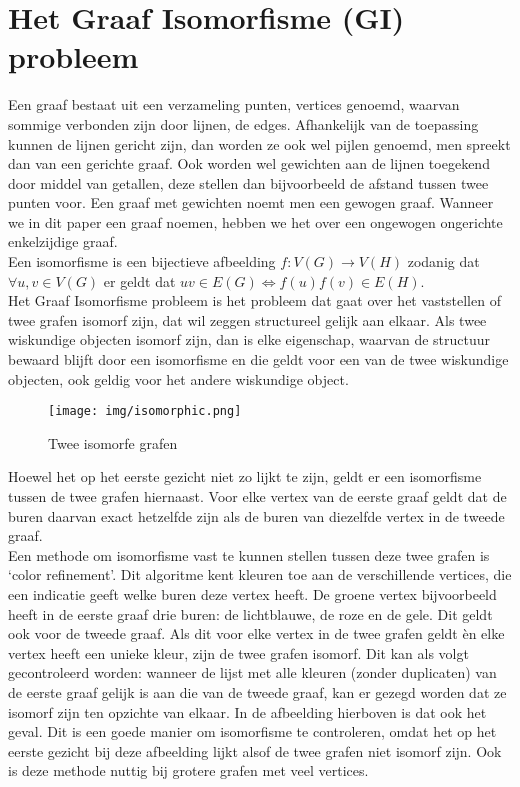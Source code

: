 \documentclass{article}
\begin{document}
\section{Het Graaf Isomorfisme (GI) probleem}
Een graaf bestaat uit een verzameling punten, vertices genoemd, waarvan sommige verbonden zijn door lijnen, de edges. Afhankelijk van de toepassing kunnen de lijnen gericht zijn, dan worden ze ook wel pijlen genoemd, men spreekt dan van een gerichte graaf. Ook worden wel gewichten aan de lijnen toegekend door middel van getallen, deze stellen dan bijvoorbeeld de afstand tussen twee punten voor. Een graaf met gewichten noemt men een gewogen graaf. Wanneer we in dit paper een graaf noemen, hebben we het over een ongewogen ongerichte enkelzijdige graaf.\\

Een isomorfisme is een bijectieve afbeelding $f:V(G) \rightarrow V(H)$ zodanig dat $\forall u,v \in V(G)$ er geldt dat $uv \in E(G) \Leftrightarrow f(u)f(v)\in E(H)$.\\

Het Graaf Isomorfisme probleem is het probleem dat gaat over het vaststellen of twee grafen isomorf zijn, dat wil zeggen structureel gelijk aan elkaar. Als twee wiskundige objecten isomorf zijn, dan is elke eigenschap, waarvan de structuur bewaard blijft door een isomorfisme en die geldt voor een van de twee wiskundige objecten, ook geldig voor het andere wiskundige object.\\

\begin{wrapfigure}{r}{0.5\textwidth}
\renewcommand{\figurename}{Figuur}
\begin{center}
\texttt{[image: img/isomorphic.png]}
\end{center}
\caption{Twee isomorfe grafen}
\end{wrapfigure}

Hoewel het op het eerste gezicht niet zo lijkt te zijn, geldt er een isomorfisme tussen de twee grafen hiernaast. Voor elke vertex van de eerste graaf geldt dat de buren daarvan exact hetzelfde zijn als de buren van diezelfde vertex in de tweede graaf.\\

Een methode om isomorfisme vast te kunnen stellen tussen deze twee grafen is ‘color refinement’. Dit algoritme kent kleuren toe aan de verschillende vertices, die een indicatie geeft welke buren deze vertex heeft. De groene vertex bijvoorbeeld heeft in de eerste graaf drie buren: de lichtblauwe, de roze en de gele. Dit geldt ook voor de tweede graaf. Als dit voor elke vertex in de twee grafen geldt \`en elke vertex heeft een unieke kleur, zijn de twee grafen isomorf. Dit kan als volgt gecontroleerd worden: wanneer de lijst met alle kleuren (zonder duplicaten) van de eerste graaf gelijk is aan die van de tweede graaf, kan er gezegd worden dat ze isomorf zijn ten opzichte van elkaar. In de afbeelding hierboven is dat ook het geval.
Dit is een goede manier om isomorfisme te controleren, omdat het op het eerste gezicht bij deze afbeelding lijkt alsof de twee grafen niet isomorf zijn. Ook is deze methode nuttig bij grotere grafen met veel vertices.
\end{document}
